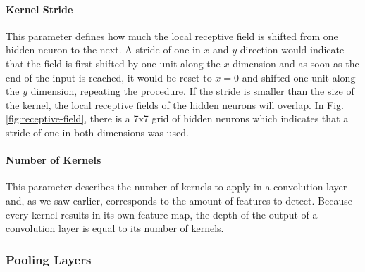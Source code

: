 \paragraph{Kernel Stride}

This parameter defines how much the local receptive field is shifted
from one hidden neuron to the next. A stride of one in \(x\) and \(y\)
direction would indicate that the field is first shifted by one unit
along the \(x\) dimension and as soon as the end of the input is
reached, it would be reset to \(x=0\) and shifted one unit along the
\(y\) dimension, repeating the procedure. If the stride is smaller
than the size of the
kernel, the local receptive fields of the hidden neurons will overlap.
In Fig. \ref{fig:receptive-field}, there is a 7x7 grid of hidden
neurons which indicates that a stride of one in both dimensions was
used.

\paragraph{Number of Kernels}

This parameter describes the number of kernels to apply in a
convolution layer and, as we saw earlier, corresponds to the amount of
features to detect. Because every kernel results in its own feature
map, the depth of the output of a convolution layer is equal to its
number of kernels.

\subsubsection{Pooling Layers}

